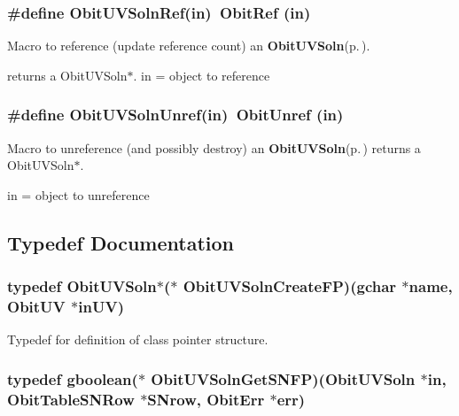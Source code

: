 \subsubsection{\setlength{\rightskip}{0pt plus 5cm}\#define Obit\-UVSoln\-Ref(in)\ Obit\-Ref (in)}\label{ObitUVSoln_8h_a1}


Macro to reference (update reference count) an {\bf Obit\-UVSoln}{\rm (p.\,\pageref{structObitUVSoln})}. 

returns a Obit\-UVSoln$\ast$. in = object to reference 
\subsubsection{\setlength{\rightskip}{0pt plus 5cm}\#define Obit\-UVSoln\-Unref(in)\ Obit\-Unref (in)}\label{ObitUVSoln_8h_a0}


Macro to unreference (and possibly destroy) an {\bf Obit\-UVSoln}{\rm (p.\,\pageref{structObitUVSoln})} returns a Obit\-UVSoln$\ast$. 

in = object to unreference 

\subsection{Typedef Documentation}
\subsubsection{\setlength{\rightskip}{0pt plus 5cm}typedef {\bf Obit\-UVSoln}$\ast$($\ast$ {\bf Obit\-UVSoln\-Create\-FP})(gchar $\ast$name, {\bf Obit\-UV} $\ast$in\-UV)}\label{ObitUVSoln_8h_a3}


Typedef for definition of class pointer structure. 

\subsubsection{\setlength{\rightskip}{0pt plus 5cm}typedef gboolean($\ast$ {\bf Obit\-UVSoln\-Get\-SNFP})({\bf Obit\-UVSoln} $\ast$in, {\bf Obit\-Table\-SNRow} $\ast$SNrow, {\bf Obit\-Err} $\ast$err)}\label{ObitUVSoln_8h_a5}


